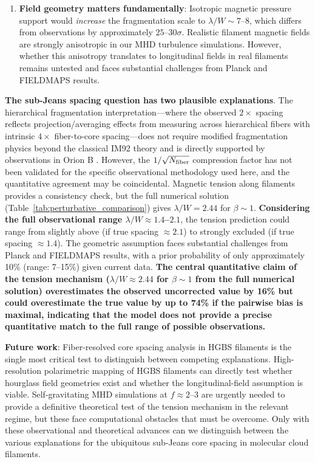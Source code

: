 \documentclass[11pt,a4paper]{article}
\begin{document}
\begin{enumerate}
    \item \textbf{Field geometry matters fundamentally}: Isotropic magnetic pressure support would \textit{increase} the fragmentation scale to $\lambda/W \sim 7$--$8$, which differs from observations by approximately $25$--$30\sigma$. Realistic filament magnetic fields are strongly anisotropic in our MHD turbulence simulations. However, whether this anisotropy translates to longitudinal fields in real filaments remains untested and faces substantial challenges from Planck and FIELDMAPS results.
\end{enumerate}

\textbf{The sub-Jeans spacing question has two plausible explanations}. The hierarchical fragmentation interpretation—where the observed $2\times$ spacing reflects projection/averaging effects from measuring across hierarchical fibers with intrinsic $4\times$ fiber-to-core spacing—does not require modified fragmentation physics beyond the classical IM92 theory and is directly supported by observations in Orion B \citep{Yang2024}. However, the $1/\sqrt{N_{\rm fiber}}$ compression factor has not been validated for the specific observational methodology used here, and the quantitative agreement may be coincidental. Magnetic tension along filaments provides a consistency check, but the full numerical solution (Table~\ref{tab:perturbative_comparison}) gives $\lambda/W = 2.44$ for $\beta \sim 1$. \textbf{Considering the full observational range $\lambda/W \approx 1.4$--$2.1$}, the tension prediction could range from slightly above (if true spacing $\approx 2.1$) to strongly excluded (if true spacing $\approx 1.4$). The geometric assumption faces substantial challenges from Planck and FIELDMAPS results, with a prior probability of only approximately 10\% (range: 7--15\%) given current data. \textbf{The central quantitative claim of the tension mechanism ($\lambda/W \approx 2.44$ for $\beta \sim 1$ from the full numerical solution) overestimates the observed uncorrected value by 16\% but could overestimate the true value by up to 74\% if the pairwise bias is maximal, indicating that the model does not provide a precise quantitative match to the full range of possible observations.}

\textbf{Future work}: Fiber-resolved core spacing analysis in HGBS filaments is the single most critical test to distinguish between competing explanations. High-resolution polarimetric mapping of HGBS filaments can directly test whether hourglass field geometries exist and whether the longitudinal-field assumption is viable. Self-gravitating MHD simulations at $f \approx 2$--$3$ are urgently needed to provide a definitive theoretical test of the tension mechanism in the relevant regime, but these face computational obstacles that must be overcome. Only with these observational and theoretical advances can we distinguish between the various explanations for the ubiquitous sub-Jeans core spacing in molecular cloud filaments.
\end{document}
